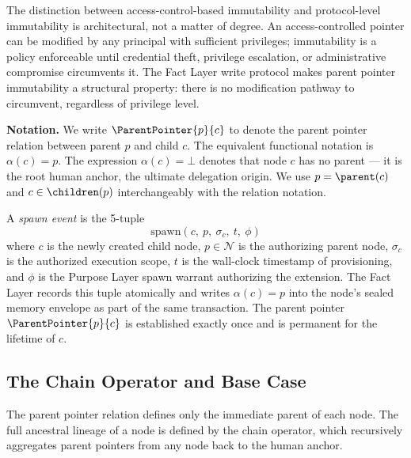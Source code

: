 The distinction between access-control-based immutability and protocol-level immutability is architectural, not a matter of degree. An access-controlled pointer can be modified by any principal with sufficient privileges; immutability is a policy enforceable until credential theft, privilege escalation, or administrative compromise circumvents it. The Fact Layer write protocol makes parent pointer immutability a structural property: there is no modification pathway to circumvent, regardless of privilege level.

\bigskip
\noindent\textbf{Notation.} We write $\ParentPointer{p}{c}$ to denote the parent pointer relation between parent $p$ and child $c$. The equivalent functional notation is $\alpha(c) = p$. The expression $\alpha(c) = \bot$ denotes that node $c$ has no parent --- it is the root human anchor, the ultimate delegation origin. We use $p = \parent(c)$ and $c \in \children(p)$ interchangeably with the relation notation.

\begin{dfn}
\label{dfn:spawn-event}
A \emph{spawn event} is the 5-tuple
\begin{equation}
\mathrm{spawn}(c,\ p,\ \sigma_c,\ t,\ \phi)
\end{equation}
where $c$ is the newly created child node, $p \in \mathcal{N}$ is the authorizing parent node, $\sigma_c$ is the authorized execution scope, $t$ is the wall-clock timestamp of provisioning, and $\phi$ is the Purpose Layer spawn warrant authorizing the extension. The Fact Layer records this tuple atomically and writes $\alpha(c) = p$ into the node's sealed memory envelope as part of the same transaction. The parent pointer $\ParentPointer{p}{c}$ is established exactly once and is permanent for the lifetime of $c$.
\end{dfn}

\subsection{The Chain Operator and Base Case}
\label{sec:chain-operator}

The parent pointer relation defines only the immediate parent of each node. The full ancestral lineage of a node is defined by the chain operator, which recursively aggregates parent pointers from any node back to the human anchor.

